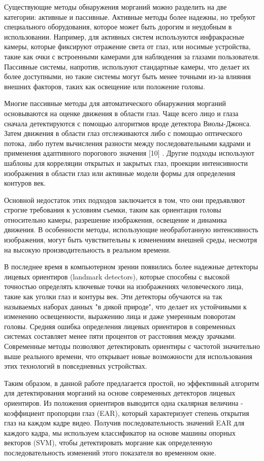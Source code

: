 Существующие методы обнаружения морганий можно разделить на две
категории: активные и пассивные. Активные методы более надежны, но
требуют специального оборудования, которое может быть дорогим и
неудобным в использовании. Например, для активных систем используются
инфракрасные камеры, которые фиксируют отражение света от глаз, или
носимые устройства, такие как очки с встроенными камерами для наблюдения
за глазами пользователя. Пассивные системы, напротив, используют
стандартные камеры, что делает их более доступными, но такие системы
могут быть менее точными из-за влияния внешних факторов, таких как
освещение или положение головы.

Многие пассивные методы для автоматического обнаружения морганий
основываются на оценке движения в области глаз. Чаще всего лицо и глаза
сначала детектируются с помощью алгоритмов вроде детектора Виолы-Джонса.
Затем движения в области глаз отслеживаются либо с помощью оптического
потока, либо путем вычисления разности между последовательными кадрами и
применения адаптивного порогового значения {[}10{]} . Другие подходы
используют шаблоны для корреляции открытых и закрытых глаз, проекции
интенсивности изображения в области глаз или активные модели формы для
определения контуров век.

Основной недостаток этих подходов заключается в том, что они предъявляют
строгие требования к условиям съемки, таким как ориентация головы
относительно камеры, разрешение изображения, освещение и динамика
движения. В особенности методы, использующие необработанную
интенсивность изображения, могут быть чувствительны к изменениям внешней
среды, несмотря на высокую производительность в реальном времени.

В последнее время в компьютерном зрении появились более надежные
детекторы лицевых ориентиров (landmark detectors), которые способны с
высокой точностью определять ключевые точки на изображениях
человеческого лица, такие как уголки глаз и контуры век. Эти детекторы
обучаются на так называемых наборах данных "в дикой природе", что делает
их устойчивыми к изменению освещенности, выражению лица и даже умеренным
поворотам головы. Средняя ошибка определения лицевых ориентиров в
современных системах составляет менее пяти процентов от расстояния между
зрачками. Современные методы позволяют детектировать ориентиры с
частотой значительно выше реального времени, что открывает новые
возможности для использования этих технологий в повседневных
устройствах.

Таким образом, в данной работе предлагается простой, но эффективный
алгоритм для детектирования морганий на основе современных детекторов
лицевых ориентиров. Из положения ориентиров выводится одна скалярная
величина - коэффициент пропорции глаз (EAR), который характеризует
степень открытия глаз на каждом кадре видео. Получив последовательность
значений EAR для каждого кадра, мы используем классификатор на основе
машины опорных векторов (SVM), чтобы детектировать моргание как
определенную последовательность изменений этого показателя во временном
окне.

